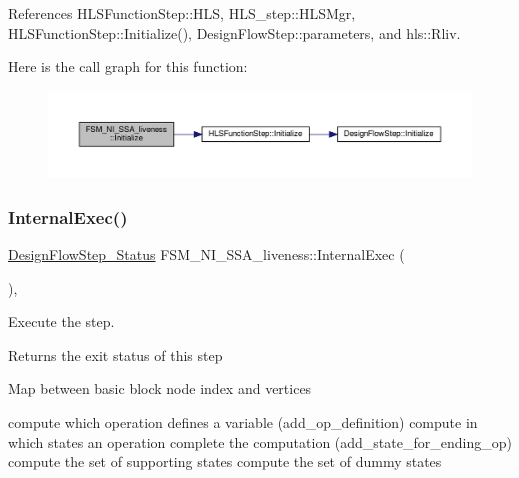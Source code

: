 References H\+L\+S\+Function\+Step\+::\+H\+LS, H\+L\+S\+\_\+step\+::\+H\+L\+S\+Mgr, H\+L\+S\+Function\+Step\+::\+Initialize(), Design\+Flow\+Step\+::parameters, and hls\+::\+Rliv.

Here is the call graph for this function\+:
\nopagebreak
\begin{figure}[H]
\begin{center}
\leavevmode
\includegraphics[width=350pt]{d4/dd8/classFSM__NI__SSA__liveness_a36cbd84735c2126d760d7fbdadab9d5e_cgraph}
\end{center}
\end{figure}
\mbox{\label{classFSM__NI__SSA__liveness_a4779c2c3c70f08d16a164de63ecc25e9}} 
\subsubsection{\texorpdfstring{Internal\+Exec()}{InternalExec()}}
{\footnotesize\ttfamily \hyperlink{design__flow__step_8hpp_afb1f0d73069c26076b8d31dbc8ebecdf}{Design\+Flow\+Step\+\_\+\+Status} F\+S\+M\+\_\+\+N\+I\+\_\+\+S\+S\+A\+\_\+liveness\+::\+Internal\+Exec (\begin{DoxyParamCaption}{ }\end{DoxyParamCaption})\hspace{0.3cm}{\ttfamily [override]}, {\ttfamily [virtual]}}



Execute the step. 

\begin{DoxyReturn}{Returns}
the exit status of this step 
\end{DoxyReturn}
Map between basic block node index and vertices

compute which operation defines a variable (add\+\_\+op\+\_\+definition) compute in which states an operation complete the computation (add\+\_\+state\+\_\+for\+\_\+ending\+\_\+op) compute the set of supporting states compute the set of dummy states

